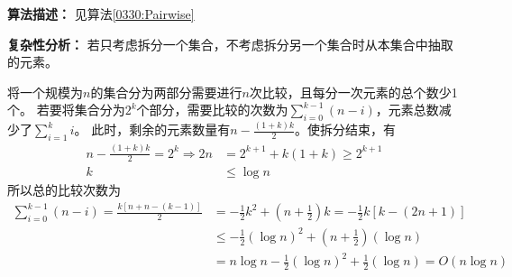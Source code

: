 \begin{questions}
\begin{solution}
        \textbf{算法描述：}
        见算法\ref{0330:Pairwise}

        \textbf{复杂性分析：}
        若只考虑拆分一个集合，不考虑拆分另一个集合时从本集合中抽取的元素。

        将一个规模为$n$的集合分为两部分需要进行$n$次比较，且每分一次元素的总个数少1个。
        若要将集合分为$2^k$个部分，需要比较的次数为$\sum_{i = 0}^{k-1} {(n-i)}$，元素总数减少了$\sum_{i=1}^k i$。
        此时，剩余的元素数量有$n - \frac{(1+k)k}{2}$。使拆分结束，有\begin{align*}
            n - \frac{(1+k)k}{2} = 2^k \Rightarrow
            2n & = 2^{k+1} + k(1+k) \ge 2^{k+1} \\
            k  & \le \log{n}
        \end{align*}
        所以总的比较次数为\begin{align*}
            \sum_{i = 0}^{k-1} {(n-i)} = \frac{k\left[n+n-(k-1)\right]}{2}
             & = - \frac{1}{2} k^2 + (n + \frac{1}{2}) k = - \frac{1}{2} k \left[ k - (2 n + 1) \right] \\
             & \le - \frac{1}{2} (\log n)^2 + (n + \frac{1}{2}) (\log n)                                \\
             & = n\log{n} - \frac{1}{2} (\log n)^2 + \frac{1}{2} (\log n) = O(n \log n)
        \end{align*}

    \end{solution}



\end{questions}
